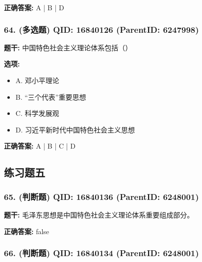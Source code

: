 \documentclass[12pt,UTF8]{ctexart}
\begin{document}
\textbf{正确答案:}
A | B | D

\vspace{0.3em}\hrulefill\vspace{0.7em}

\subsubsection*{64. (多选题) \small QID: 16840126 (ParentID: 6247998)}

\textbf{题干:}
中国特色社会主义理论体系包括（）



\textbf{选项:}
\begin{itemize}[leftmargin=*]

  \item A. 邓小平理论

  \item B. “三个代表”重要思想

  \item C. 科学发展观

  \item D. 习近平新时代中国特色社会主义思想

\end{itemize}

\textbf{正确答案:}
A | B | C | D

\vspace{0.3em}\hrulefill\vspace{0.7em}

\subsection*{练习题五}

\subsubsection*{65. (判断题) \small QID: 16840136 (ParentID: 6248001)}

\textbf{题干:}
毛泽东思想是中国特色社会主义理论体系重要组成部分。



\textbf{正确答案:}
false

\vspace{0.3em}\hrulefill\vspace{0.7em}

\subsubsection*{66. (判断题) \small QID: 16840134 (ParentID: 6248001)}
\end{document}
